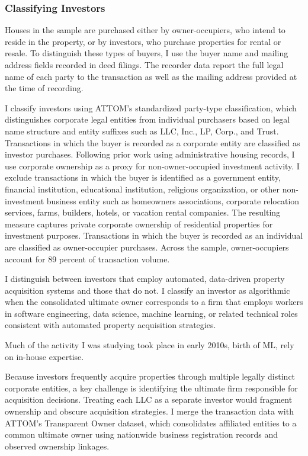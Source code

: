 \documentclass[11pt]{article}
\begin{document}
\subsubsection{Classifying Investors}\label{sec:identifyinvestors}
Houses in the sample are purchased either by owner-occupiers, who intend to reside in the property, or by investors, who purchase properties for rental or resale. To distinguish these types of buyers, I use the buyer name and mailing address fields recorded in deed filings. The recorder data report the full legal name of each party to the transaction as well as the mailing address provided at the time of recording.

I classify investors using ATTOM’s standardized party-type classification, which distinguishes corporate legal entities from individual purchasers based on legal name structure and entity suffixes such as LLC, Inc., LP, Corp., and Trust. Transactions in which the buyer is recorded as a corporate entity are classified as investor purchases. Following prior work using administrative housing records, I use corporate ownership as a proxy for non-owner-occupied investment activity. I exclude transactions in which the buyer is identified as a government entity, financial institution, educational institution, religious organization, or other non-investment business entity such as homeowners associations, corporate relocation services, farms, builders, hotels, or vacation rental companies. The resulting measure captures private corporate ownership of residential properties for investment purposes. Transactions in which the buyer is recorded as an individual are classified as owner-occupier purchases. Across the sample, owner-occupiers account for 89 percent of transaction volume.


I distinguish between investors that employ automated, data-driven property acquisition systems and those that do not. I classify an investor as algorithmic when the consolidated ultimate owner corresponds to a firm that employs workers in software engineering, data science, machine learning, or related technical roles consistent with automated property acquisition strategies.

Much of the activity I was studying took place in early 2010s, birth of ML, rely on in-house expertise. 

Because investors frequently acquire properties through multiple legally distinct corporate entities, a key challenge is identifying the ultimate firm responsible for acquisition decisions. Treating each LLC as a separate investor would fragment ownership and obscure acquisition strategies. I merge the transaction data with ATTOM’s Transparent Owner dataset, which consolidates affiliated entities to a common ultimate owner using nationwide business registration records and observed ownership linkages.
\end{document}
